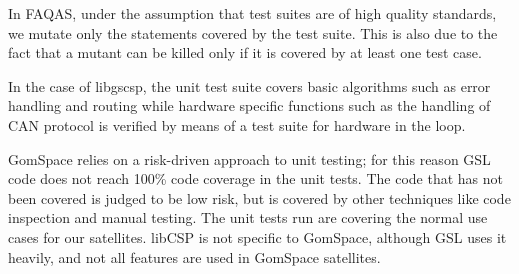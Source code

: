 In FAQAS, under the assumption that test suites are of high quality standards, we mutate only the statements covered by the test suite. This is also due to the fact that a mutant can be killed only if it is covered by at least one test case. 

In the case of libgscsp, the unit test suite covers basic algorithms such as error handling and routing while hardware specific functions such as the handling of CAN protocol is verified by means of a test suite for hardware in the loop. 

GomSpace relies on a risk-driven approach to unit testing; for this reason GSL code does not reach 100\% code coverage in the unit tests. The code that has not been covered is judged to be low risk, but is covered by other techniques like code inspection and manual testing. The unit tests run are covering the normal use cases for our satellites. libCSP is not specific to GomSpace, although GSL uses it heavily, and not all features are used in GomSpace satellites.


	

